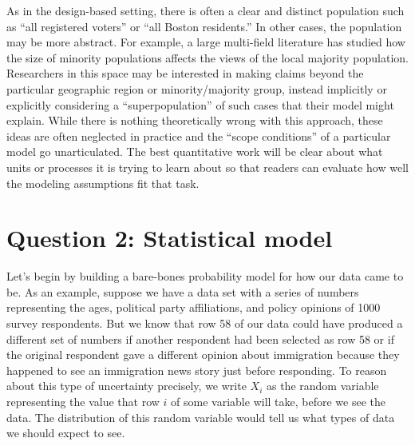 \documentclass[
  13pt,
  letterpaper,
  DIV=11,
  numbers=noendperiod]{scrreprt}
\theoremstyle{plain}
\theoremstyle{plain}
\theoremstyle{definition}
\theoremstyle{definition}
\theoremstyle{remark}
\begin{document}
As in the design-based setting, there is often a clear and distinct
population such as ``all registered voters'' or ``all Boston
residents.'' In other cases, the population may be more abstract. For
example, a large multi-field literature has studied how the size of
minority populations affects the views of the local majority population.
Researchers in this space may be interested in making claims beyond the
particular geographic region or minority/majority group, instead
implicitly or explicitly considering a ``superpopulation'' of such cases
that their model might explain. While there is nothing theoretically
wrong with this approach, these ideas are often neglected in practice
and the ``scope conditions'' of a particular model go unarticulated. The
best quantitative work will be clear about what units or processes it is
trying to learn about so that readers can evaluate how well the modeling
assumptions fit that task.

\section{Question 2: Statistical
model}\label{question-2-statistical-model}

Let's begin by building a bare-bones probability model for how our data
came to be. As an example, suppose we have a data set with a series of
numbers representing the ages, political party affiliations, and policy
opinions of 1000 survey respondents. But we know that row 58 of our data
could have produced a different set of numbers if another respondent had
been selected as row 58 or if the original respondent gave a different
opinion about immigration because they happened to see an immigration
news story just before responding. To reason about this type of
uncertainty precisely, we write \(X_i\) as the random variable
representing the value that row \(i\) of some variable will take, before
we see the data. The distribution of this random variable would tell us
what types of data we should expect to see.
\end{document}
